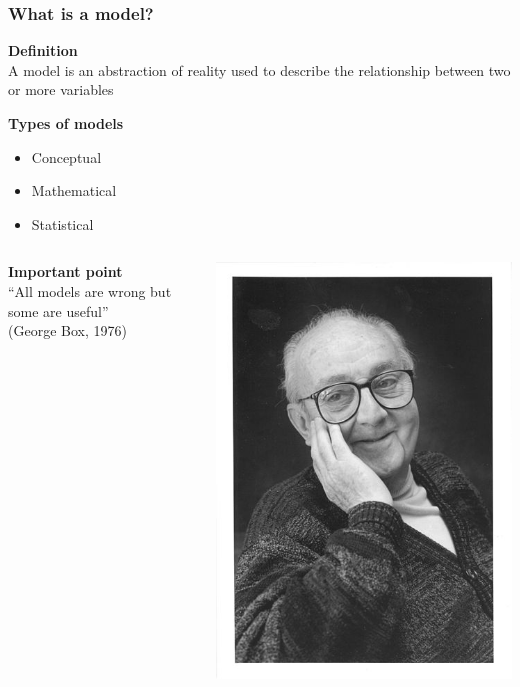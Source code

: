 \documentclass[color=usenames,dvipsnames]{beamer}\usepackage[]{graphicx}\usepackage[]{color}
\begin{document}
\begin{frame}
  \frametitle{What is a model?}
    {\bf Definition} \\
    A model is an abstraction of reality used to describe the
    relationship between two or more variables \par
    \pause
    \vfill %
    {\bf Types of models}
    \begin{itemize}
      \item Conceptual
      \item Mathematical
      \item Statistical
    \end{itemize}
  \pause
  \vfill
  \begin{columns}%
    \begin{column}[T]{0.75\textwidth}
      {\bf Important point} \\
      ``All models are wrong but some are useful'' \\ (George Box, 1976) %
    \end{column}
    \begin{column}[T]{0.15\textwidth}
      {\includegraphics[width=\textwidth]{figs/Box}} \\
    \end{column}
  \end{columns}
\end{frame}
\end{document}
